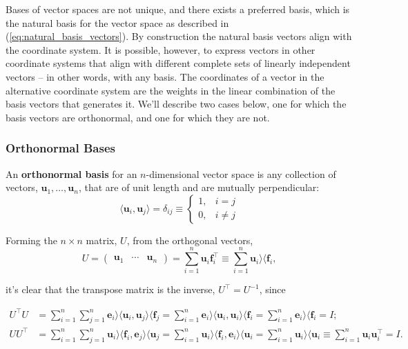 \documentclass[12pt, twoside, draft]{article}
\begin{document}
Bases of vector spaces are not unique, and there exists a preferred basis, which is the natural basis for the vector space as described in (\ref{eq:natural_basis_vectors}).  By construction the natural basis vectors align with the coordinate system.  It is possible, however, to express vectors in other coordinate systems that align with different complete sets of linearly independent vectors -- in other words, with any basis.  The coordinates of a vector in the alternative coordinate system are the weights in the linear combination of the basis vectors that generates it.  We'll describe two cases below, one for which the basis vectors are orthonormal, and one for which they are not.

\subsubsection{Orthonormal Bases}\label{sec:orthonormal-bases}
An \textbf{orthonormal basis} for an $n$-dimensional vector space is any collection of vectors, $\mathbf{u}_1, \ldots, \mathbf{u}_n$, that are of unit length and are mutually perpendicular:
\begin{equation}\label{eq:orthonormal_basis}
\langle \mathbf{u}_i, \mathbf{u}_j \rangle = \delta_{ij} \equiv \begin{cases} 1, & i=j \\ 0, & i\neq j \end{cases}
\end{equation}

Forming the $n \times n$ matrix, $U$, from the orthogonal vectors,
\begin{equation}\label{eq:basis_column_space}
U = \begin{pmatrix} \mathbf{u}_1 & \cdots & \mathbf{u}_n \end{pmatrix} = \sum_{i=1}^n \mathbf{u}_i \mathbf{f}_i^\top \equiv \sum_{i=1}^n \mathbf{u}_i \rangle \langle \mathbf{f}_i,
\end{equation}

it's clear that the transpose matrix is the inverse, $U^\top = U^{-1}$, since

\begin{align}\label{eq:basis_inverse}
U^\top U &=  \sum_{i=1}^n \sum_{j=1}^n \mathbf{e}_i \rangle \langle \mathbf{u}_i , \mathbf{u}_j \rangle \langle \mathbf{f}_j  =   \sum_{i=1}^n\mathbf{e}_i \rangle \langle \mathbf{u}_i , \mathbf{u}_i \rangle \langle \mathbf{f}_i = \sum_{i=1}^n \mathbf{e}_i \rangle \langle \mathbf{f}_i = I; \\
UU^\top &= \sum_{i=1}^n \sum_{j=1}^n \mathbf{u}_i \rangle \langle \mathbf{f}_i , \mathbf{e}_j \rangle \langle \mathbf{u}_j  = \sum_{i=1}^n \mathbf{u}_i \rangle \langle \mathbf{f}_i , \mathbf{e}_i \rangle \langle \mathbf{u}_i = \sum_{i=1}^n \mathbf{u}_i \rangle \langle \mathbf{u}_i \equiv \sum_{i=1}^n \mathbf{u}_i \mathbf{u}_i^\top = I.
\end{align}
\end{document}
